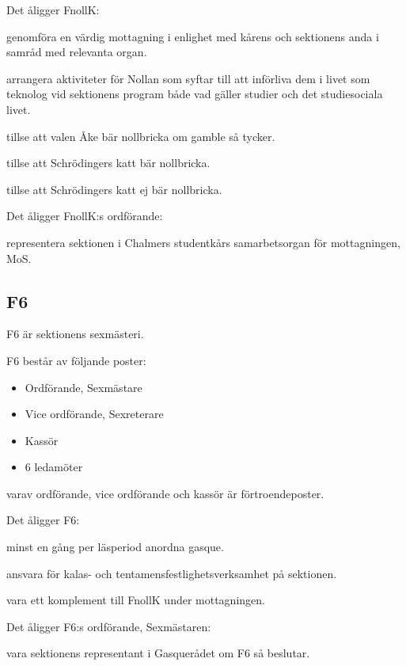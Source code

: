 \documentclass{styrdokument}
\begin{document}
\? Det åligger FnollK:
\begin{aligganden}
    \item genomföra en värdig mottagning i enlighet med kårens och sektionens anda i samråd med relevanta organ.
    \item arrangera aktiviteter för Nollan som syftar till att införliva dem i livet som teknolog vid sektionens program både vad gäller studier och det studiesociala livet.
    \item tillse att valen Åke bär nollbricka om gamble så tycker.
    \item tillse att Schrödingers katt bär nollbricka.
    \item tillse att Schrödingers katt ej bär nollbricka.
\end{aligganden}

\? Det åligger FnollK:s ordförande:
\begin{aligganden}
    \item representera sektionen i Chalmers studentkårs samarbetsorgan för mottagningen, MoS.
\end{aligganden}

\subsection{F6}
\? F6 är sektionens sexmästeri.

\? F6 består av följande poster:
\begin{itemize}
	\item Ordförande, Sexmästare
	\item Vice ordförande, Sexreterare
	\item Kassör
	\item 6 ledamöter
\end{itemize}
varav ordförande, vice ordförande och kassör är förtroendeposter.

\? Det åligger F6:
\begin{aligganden}
    \item minst en gång per läsperiod anordna gasque.
    \item ansvara för kalas- och tentamensfestlighetsverksamhet på sektionen.
    \item vara ett komplement till FnollK under mottagningen.
\end{aligganden}

\? Det åligger F6:s ordförande, Sexmästaren:
\begin{aligganden}
    \item vara sektionens representant i Gasquerådet om F6 så beslutar.
\end{aligganden}
\end{document}
